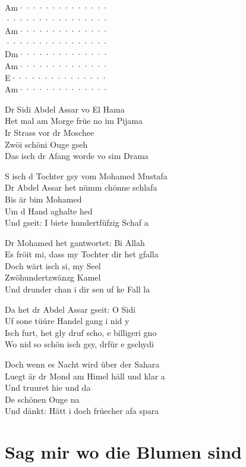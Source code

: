 \documentclass[
  letterpaper,
]{scrbook}
\begin{document}
\textbar Am······\textbar········\textbar{}\\
\textbar········\textbar········\textbar{}\\
\textbar Am······\textbar········\textbar{}\\
\textbar········\textbar········\textbar{}\\
\textbar Dm······\textbar········\textbar{}\\
\textbar Am······\textbar········\textbar{}\\
\textbar E·······\textbar········\textbar{}\\
\textbar Am······\textbar········\textbar{}

Dr Sidi Abdel Assar vo El Hama\\
Het mal am Morge früe no im Pijama\\
Ir Strass vor dr Moschee\\
Zwöi schöni Ouge gseh\\
Das isch dr Afang worde vo sim Drama

S isch d Tochter gsy vom Mohamed Mustafa\\
Dr Abdel Assar het nümm chönne schlafa\\
Bis är bim Mohamed\\
Um d Hand aghalte hed\\
Und gseit: I biete hundertfüfzig Schaf a

Dr Mohamed het gantwortet: Bi Allah\\
Es fröit mi, dass my Tochter dir het gfalla\\
Doch wärt isch si, my Seel\\
Zwöhundertzwänzg Kamel\\
Und drunder chan i dir sen uf ke Fall la

Da het dr Abdel Assar gseit: O Sidi\\
Uf sone tüüre Handel gang i nid y\\
Isch furt, het gly druf scho, e billigeri gno\\
Wo nid so schön isch gsy, drfür e gschydi

Doch wenn es Nacht wird über der Sahara\\
Luegt är dr Mond am Himel häll und klar a\\
Und truuret hie und da\\
De schönen Ouge na\\
Und dänkt: Hätt i doch früecher afa spara

\hypertarget{sag-mir-wo-die-blumen-sind}{%
\chapter{Sag mir wo die Blumen sind}\label{sag-mir-wo-die-blumen-sind}}
\end{document}
